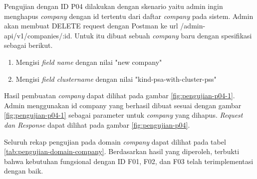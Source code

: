 Pengujian dengan ID P04 dilakukan dengan skenario yaitu admin ingin menghapus \textit{company} dengan id tertentu dari daftar \textit{company} pada sistem. Admin akan membuat DELETE request dengan Postman ke url /admin-api/v1/companies/:id. Untuk itu dibuat sebuah \textit{company} baru dengan spesifikasi sebagai berikut.

\begin{enumerate}
  \item Mengisi \textit{field name} dengan nilai "new company"
  \item Mengisi \textit{field cluster\textunderscore name} dengan nilai "kind-psa-with-cluster-pss"
\end{enumerate}

Hasil pembuatan \textit{company} dapat dilihat pada gambar \ref{fig:pengujian-p04-1}. Admin menggunakan id company yang berhasil dibuat sesuai dengan gambar \ref{fig:pengujian-p04-1} sebagai parameter untuk \textit{company} yang dihapus. \textit{Request dan Response} dapat dilihat pada gambar \ref{fig:pengujian-p04}.

Seluruh rekap pengujian pada domain \textit{company} dapat dilihat pada tabel \ref{tab:pengujian-domain-company}. Berdasarkan hasil yang diperoleh, terbukti bahwa kebutuhan fungsional dengan ID F01, F02, dan F03 telah terimplementasi dengan baik.
